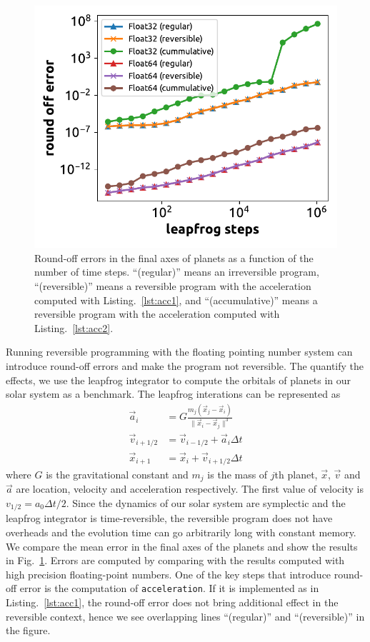 \documentclass{article}
\newcommand{\<}{\langle}
\renewcommand{\>}{\rangle}
\newcommand{\Fig}[1]{Fig.~\ref{#1}}
\newcommand{\Lst}[1]{Listing.~\ref{#1}}
\theoremstyle{definition}\newtheorem{definition}{\textit{Definition}}
\begin{document}
\begin{figure}
    \centerline{\includegraphics[width=0.5\columnwidth,trim={0 0cm 0 0},clip]{fig11.pdf}}
    \caption{Round-off errors in the final axes of planets as a function of the number of time steps. ``(regular)'' means an irreversible program, ``(reversible)'' means a reversible program with the acceleration computed with \Lst{lst:acc1}, and ``(accumulative)'' means a reversible program with the acceleration computed with \Lst{lst:acc2}.}\label{fig:leapfrog}
\end{figure}
Running reversible programming with the floating pointing number system can introduce round-off errors and make the program not reversible. The quantify the effects, we use the leapfrog integrator to compute the orbitals of planets in our solar system as a benchmark. The leapfrog interations can be represented as
\begin{align}
    \vec a_i &= G\frac{m_j (\vec x_j-\vec x_i)}{\|\vec x_i - \vec x_j\|^3}\\
    \vec v_{i+1/2} &= \vec v_{i-1/2} + \vec a_{i} \Delta t\\
    \vec x_{i+1} &= \vec x_i + \vec v_{i+1/2}\Delta t
\end{align}
where $G$ is the gravitational constant and $m_j$ is the mass of $j$th planet, $\vec x$, $\vec v$ and $\vec a$ are location, velocity and acceleration respectively. The first value of velocity is $v_{1/2} = a_0 \Delta t/2$.
Since the dynamics of our solar system are symplectic and the leapfrog integrator is time-reversible, the reversible program does not have overheads and the evolution time can go arbitrarily long with constant memory.
We compare the mean error in the final axes of the planets and show the results in \Fig{fig:leapfrog}.
Errors are computed by comparing with the results computed with high precision floating-point numbers.
One of the key steps that introduce round-off error is the computation of \texttt{acceleration}. If it is implemented as in \Lst{lst:acc1}, the round-off error does not bring additional effect in the reversible context, hence we see overlapping lines ``(regular)'' and ``(reversible)'' in the figure.
\end{document}
